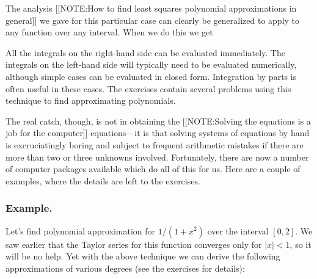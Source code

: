 The analysis 
[[NOTE:How to find least squares polynomial approximations in general]]
we gave for this particular case can clearly be generalized to apply
to any function over any interval.  When we do this we get
\begin{center}
\end{center}




All the integrals on the right-hand side can be evaluated immediately.
The integrals on the left-hand side will typically need to be
evaluated numerically, although simple cases can be evaluated in
closed form.  Integration by parts is often useful in these cases.
The exercises contain several problems using this technique to find
approximating polynomials.



The real catch, though, is not in obtaining the 
[[NOTE:Solving the equations is a job for the computer]]
equations---it is that solving systems of equations by hand is
excruciatingly boring and subject to frequent arithmetic mistakes if
there are more than two or three unknowns involved.  Fortunately,
there are now a number of computer packages available which do all of
this for us.  Here are a couple of examples, where the details are
left to the exercises.




\subsubsection{Example.}
Let's find polynomial approximation for
\mbox{$1/(1+x^2)$} over the interval $[0, 2]$.  We saw earlier that
the Taylor series for this function converges only for $|x|<1$, so it
will be no help.  Yet with the above technique we can derive the
following approximations of various degrees (see the exercises for
details):

